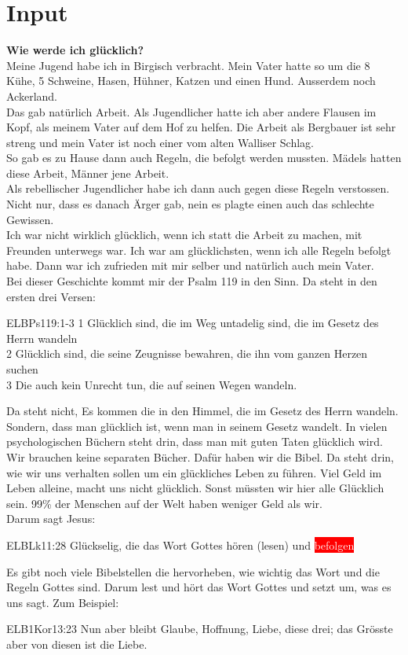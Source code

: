 \documentclass{../inc/mybib}
\begin{document}
\section{ Input }
\begin{spacing}{1.5}
\textbf{Wie werde ich glücklich?}\\
Meine Jugend habe ich in Birgisch verbracht. Mein Vater hatte so um die 8 Kühe, 5 Schweine, Hasen, Hühner, Katzen und einen Hund. Ausserdem noch Ackerland.\\
Das gab natürlich Arbeit. Als Jugendlicher hatte ich aber andere Flausen im Kopf, als meinem Vater auf dem Hof zu helfen. Die Arbeit als Bergbauer ist sehr streng und mein Vater ist noch einer vom alten Walliser Schlag.\\ So gab es zu Hause dann auch Regeln, die befolgt werden mussten. Mädels hatten diese Arbeit, Männer jene Arbeit.\\
Als rebellischer Jugendlicher habe ich dann auch gegen diese Regeln verstossen. Nicht nur, dass es danach Ärger gab, nein es plagte einen auch das schlechte Gewissen.\\ Ich war nicht wirklich glücklich, wenn ich statt die Arbeit zu machen, mit Freunden unterwegs war. Ich war am glücklichsten, wenn ich alle Regeln befolgt habe. Dann war ich zufrieden mit mir selber und natürlich auch mein Vater.\\
Bei dieser Geschichte kommt mir der Psalm 119 in den Sinn. Da steht in den ersten drei Versen:
\begin{bibeltext}{ELB}{Ps}{119:1-3}
1 Glücklich sind, die im Weg untadelig sind, die im Gesetz des Herrn wandeln\\
2 Glücklich sind, die seine Zeugnisse bewahren, die ihn vom ganzen Herzen suchen\\
3 Die auch kein Unrecht tun, die auf seinen Wegen wandeln.
\end{bibeltext}
Da steht nicht, \grqq Es kommen die in den Himmel, die im Gesetz des Herrn wandeln. \glqq{} Sondern, dass man glücklich ist, wenn man in seinem Gesetz wandelt. In vielen psychologischen Büchern steht drin, dass man mit guten Taten glücklich wird.\\
Wir brauchen keine separaten Bücher. Dafür haben wir die Bibel. Da steht drin, wie wir uns verhalten sollen um ein glückliches Leben zu führen. Viel Geld im Leben alleine, macht uns nicht glücklich. Sonst müssten wir hier alle Glücklich sein. 99\% der Menschen auf der Welt haben weniger Geld als wir.\\
Darum sagt Jesus:
\begin{bibeltext}{ELB}{Lk}{11:28}
Glückselig, die das Wort Gottes hören (lesen) und \colorbox{red}{\textcolor{white}{befolgen}}
\end{bibeltext}
Es gibt noch viele Bibelstellen die hervorheben, wie wichtig das Wort und die Regeln Gottes sind. Darum lest und hört das Wort Gottes und setzt um, was es uns sagt.
Zum Beispiel:
\begin{bibeltext}{ELB}{1Kor}{13:23}
Nun aber bleibt Glaube, Hoffnung, Liebe, diese drei; das Grösste aber von diesen ist die Liebe.
\end{bibeltext}


\end{spacing}
\end{document}
